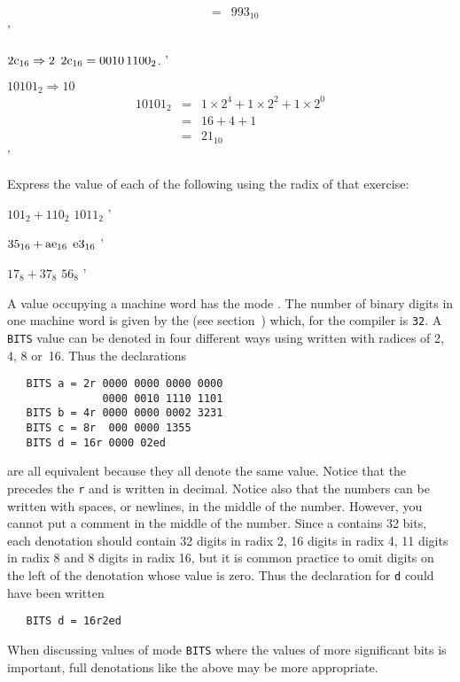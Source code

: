 \begin{exercise}
\begin{subex}
\begin{eqnarray*}
               &=&993_{10}
\end{eqnarray*}
'
\item $2\hbox{c}_{16}\Rightarrow2$ \subans $2\hbox{c}_{16}=0010\,1100_2$.
'
\item $10101_2\Rightarrow10$ \subans \begin{eqnarray*}
10101_2&=&1\times2^4+1\times2^2+1\times2^0\\
       &=&16+4+1\\
       &=&21_{10}
\end{eqnarray*}
'
\end{subex}
\item Express the value of each of the following using the radix of that
exercise:
\begin{subex}
\item $101_2+110_2$ \subans $1011_2$
'
\item $35_{16}+\hbox{ae}_{16}$ \subans $\hbox{e}3_{16}$
'
\item $17_8+37_8$ \subans $56_8$
'
\end{subex}
\end{exercise}

A value occupying a machine word has the mode . The number
of binary digits in one machine word is given by the
 (see section~)
 which, for
the  compiler is
\verb|32|. A \verb|BITS| value can be denoted in four different ways
using  written with
radices of 2, 4, 8 or~16. Thus the declarations
\begin{verbatim}
   BITS a = 2r 0000 0000 0000 0000
               0000 0010 1110 1101
   BITS b = 4r 0000 0000 0002 3231
   BITS c = 8r  000 0000 1355
   BITS d = 16r 0000 02ed
\end{verbatim}
\noindent
are all equivalent because they all denote the same value.  Notice
that the  precedes the \verb|r| and is written in decimal.
Notice also that the numbers can be written with spaces, or newlines,
in the middle of the number. However, you cannot put a comment in the
middle of the number. Since a  contains 32 bits,
each denotation should contain 32 digits in radix 2, 16 digits in
radix 4, 11 digits in radix 8 and 8 digits in radix 16, but it is
common practice to omit digits on the left of the denotation whose
value is zero.  Thus the declaration for \verb|d| could have been
written
\begin{verbatim}
   BITS d = 16r2ed
\end{verbatim}
\noindent
When discussing values of mode \verb|BITS| where the values of more
significant bits is important, full denotations like the above may be
more appropriate.

